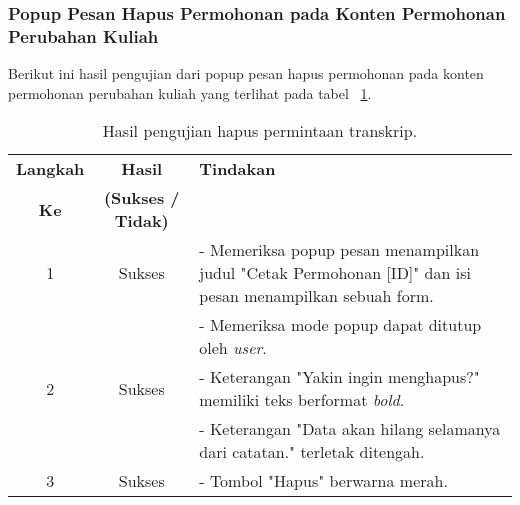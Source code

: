 \subsubsection{Popup Pesan Hapus Permohonan pada Konten Permohonan Perubahan Kuliah}
Berikut ini hasil pengujian dari popup pesan hapus permohonan pada konten permohonan perubahan kuliah yang terlihat pada tabel ~\ref{hasil:HapusPerubahanKuliah}.
\begin{table}[H]
	\centering 
	\caption{Hasil pengujian hapus permintaan transkrip.}
	\label{hasil:HapusPerubahanKuliah}
	\begin{tabular}{|c| c| p{}|}
		\toprule
		\textbf{Langkah} & \textbf{Hasil} & \textbf{Tindakan}\\
		\textbf{Ke} & \textbf{(Sukses / Tidak)} &\\
		\midrule
		1&Sukses& - Memeriksa popup pesan menampilkan judul "Cetak Permohonan [ID]" dan isi pesan menampilkan sebuah form.\\
		&& - Memeriksa mode popup dapat ditutup oleh \textit{user}.\\
		\hline
		2&Sukses& - Keterangan "Yakin ingin menghapus?" memiliki teks berformat \textit{bold}. \\
		&& - Keterangan "Data akan hilang selamanya dari catatan." terletak ditengah.\\
		\hline
		3&Sukses&- Tombol "Hapus" berwarna merah.\\	
		\bottomrule		
	\end{tabular} 
\end{table}

